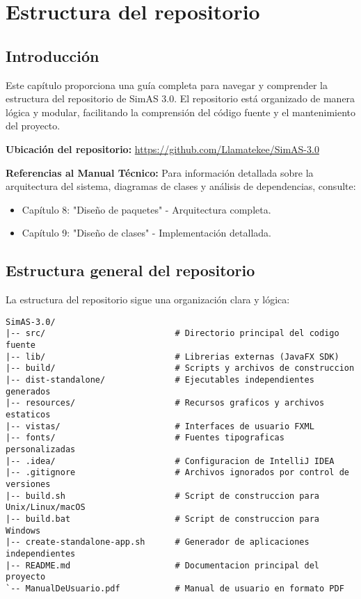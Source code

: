 \chapter{Estructura del repositorio}\label{cap-estructura-repositorio}

\section{Introducción}

Este capítulo proporciona una guía completa para navegar y comprender la estructura del repositorio de SimAS 3.0. El repositorio está organizado de manera lógica y modular, facilitando la comprensión del código fuente y el mantenimiento del proyecto.

\textbf{Ubicación del repositorio:} \url{https://github.com/Llamatekee/SimAS-3.0}

\textbf{Referencias al Manual Técnico:} Para información detallada sobre la arquitectura del sistema, diagramas de clases y análisis de dependencias, consulte:
\begin{itemize}
    \item Capítulo 8: "Diseño de paquetes" - Arquitectura completa.
    \item Capítulo 9: "Diseño de clases" - Implementación detallada.
\end{itemize}

\section{Estructura general del repositorio}

La estructura del repositorio sigue una organización clara y lógica:

\begin{lstlisting}[caption=Estructura general del repositorio]
SimAS-3.0/
|-- src/                          # Directorio principal del codigo fuente
|-- lib/                          # Librerias externas (JavaFX SDK)
|-- build/                        # Scripts y archivos de construccion
|-- dist-standalone/              # Ejecutables independientes generados
|-- resources/                    # Recursos graficos y archivos estaticos
|-- vistas/                       # Interfaces de usuario FXML
|-- fonts/                        # Fuentes tipograficas personalizadas
|-- .idea/                        # Configuracion de IntelliJ IDEA
|-- .gitignore                    # Archivos ignorados por control de versiones
|-- build.sh                      # Script de construccion para Unix/Linux/macOS
|-- build.bat                     # Script de construccion para Windows
|-- create-standalone-app.sh      # Generador de aplicaciones independientes
|-- README.md                     # Documentacion principal del proyecto
`-- ManualDeUsuario.pdf           # Manual de usuario en formato PDF
\end{lstlisting}

